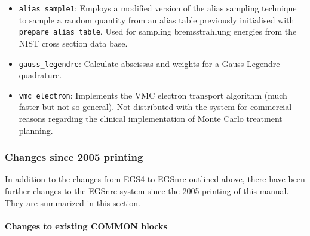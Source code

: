 \begin{itemize}
{\tt prepare\_alias\_table}: Prepares an alias sampling 
table using linear interpolation between data given 
in the arrays {\tt xs\_array} (abscissas) and {\tt ys\_array} 
(ordinates) which both have the dimension {\tt (0:nsbin)}. 
\item
{\tt alias\_sample1}: Employs a modified version of 
the alias sampling technique to sample a random 
quantity from an alias table previously initialised with 
{\tt prepare\_alias\_table}. Used for sampling bremsstrahlung 
energies from the NIST cross section data base.
\item
{\tt gauss\_legendre}: Calculate abscissas and 
weights for a Gauss-Legendre quadrature.
\item
{\tt vmc\_electron}: Implements the VMC electron transport 
algorithm (much faster but not so general). 
Not distributed with the system for 
commercial reasons regarding the clinical implementation 
of Monte Carlo treatment planning. 
\end{itemize}

\subsubsection{Changes since 2005 printing}

In addition to the changes from EGS4 to EGSnrc outlined above, there
have been further changes to the EGSnrc system since the 2005
printing of this manual.  They are summarized in this section.

\paragraph{Changes to existing COMMON blocks}

